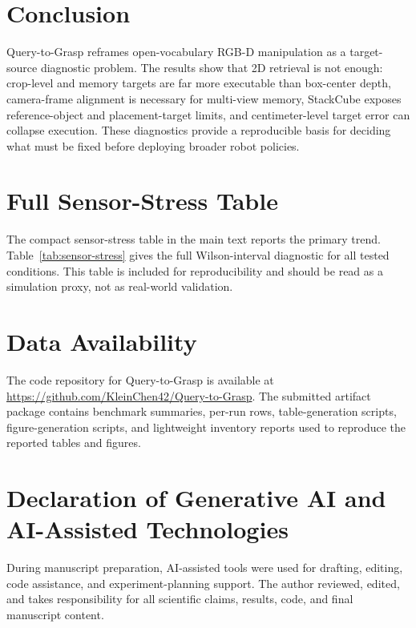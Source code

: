 \documentclass[preprint,12pt]{elsarticle}
\begin{document}
\section{Conclusion}

Query-to-Grasp reframes open-vocabulary RGB-D manipulation as a target-source
diagnostic problem. The results show that 2D retrieval is not enough:
crop-level and memory targets are far more executable than box-center depth,
camera-frame alignment is necessary for multi-view memory, StackCube exposes
reference-object and placement-target limits, and centimeter-level target error
can collapse execution. These diagnostics provide a reproducible basis for
deciding what must be fixed before deploying broader robot policies.

\clearpage
\appendix
\section{Full Sensor-Stress Table}
\label{app:sensor-stress}

The compact sensor-stress table in the main text reports the primary trend.
Table~\ref{tab:sensor-stress} gives the full Wilson-interval diagnostic for
all tested conditions. This table is included for reproducibility and should
be read as a simulation proxy, not as real-world validation.


\clearpage

\section*{Data Availability}

The code repository for Query-to-Grasp is available at
\url{https://github.com/KleinChen42/Query-to-Grasp}. The submitted artifact
package contains benchmark summaries, per-run rows, table-generation scripts,
figure-generation scripts, and lightweight inventory reports used to reproduce
the reported tables and figures.

\section*{Declaration of Generative AI and AI-Assisted Technologies}

During manuscript preparation, AI-assisted tools were used for drafting,
editing, code assistance, and experiment-planning support. The author reviewed,
edited, and takes responsibility for all scientific claims, results, code, and
final manuscript content.
\end{document}
